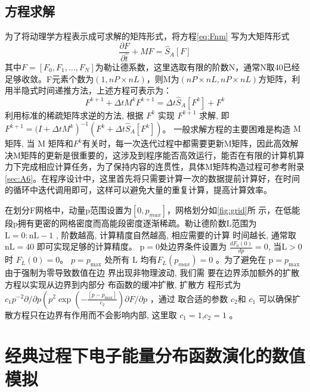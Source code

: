\subsection{方程求解}
为了将动理学方程表示成可求解的矩阵形式，将方程\eqref{eq:Fnm} 写为大矩阵形式
\begin{equation}\label{eq:dFdt}
\frac{\partial F}{\partial \hat{t}}+M F=\hat{S}_{A}[F]
\end{equation}
其中$F=[F_0,F_1,…,F_N ]$为勒让德系数，这里选取有限的阶数N，通常N取40已经足够收敛。F元素个数为$(1,nP×nL)$，则M为$(nP×nL,nP×nL)$方矩阵，利用半隐式时间递推方法，上述方程可表示为：
\begin{equation}
F^{k+1}+\Delta t M^{k} F^{k+1}=\Delta t \hat{S}_{A}\left[F^{k}\right]+F^{k}
\end{equation}
利用标准的稀疏矩阵求逆的方法, 根据  $F^{k} $ 实现 $ F^{k+1} $ 求解, 即$  F^{k+1}=(I+   \left.\Delta t M^{k}\right)^{-1}\left(F^{k}+\Delta t \hat{S}_{A}\left[F^{k}\right]\right) $。 一般求解方程的主要困难是构造  $\mathrm{M} $ 矩阵, 当  $\mathrm{M} $ 矩阵和$F^k$有关时，每一次迭代过程中都需要更新M矩阵，因此高效解决M矩阵的更新是很重要的，这涉及到程序能否高效运行，能否在有限的计算机算力下完成相应计算任务，为了保持内容的连贯性，具体M矩阵构造过程可参考附录\autoref{sec:A6}。在程序设计中，这里首先将只需要计算一次的数据提前计算好，在时间的循环中迭代调用即可，这样可以避免大量的重复计算，提高计算效率。

在划分F网格中，动量p范围设置为$[0 ,p_{max}]$，网格划分如\autoref{fig:grid}所
示，在低能段p拥有更密的网格密度而高能段密度逐渐稀疏。勒让德阶数L范围为
 $\mathrm{L}=0: \mathrm{nL}-1$ , 阶数越高, 计算精度自然越高, 相应需要的计算
 时间越长, 通常取 $ \mathrm{nL}=40 $ 即可实现足够的计算精度。 $ \mathrm{p}=0  
 $处边界条件设置为 $ \frac{d F_{0}(0)}{d p}=0$, 当$\mathrm{L}>0$  时  $F_{L}(0)=0 $。 
 $p=p_{\max }$  处所有  $\mathrm{L} $ 均有$ F_{L}(p_{max})=0$  。为了避免在  $
 \mathrm{p}=p_{\max }  $由于强制为零导致数值在边 界出现非物理波动, 我们需
 要在边界添加额外的扩散方程以实现从边界到内部分 布函数的缓冲扩散, 扩散方
 程形式为 $c_{1} p^{-2} \partial / \partial p\left(p^{2} \exp \left(-\frac{\left[p-p_{\max }\right]}{c_{2}}\right) \partial F/ \partial p\right.$  ，通过 取合适的参数 $ c_{2}  
 $和  $c_{1}$  可以确保扩散方程只在边界有作用而不会影响内部, 这里取  $c_{1}
 =1$,$ c_{2}=1$ 。
\section{经典过程下电子能量分布函数演化的数值模拟}
